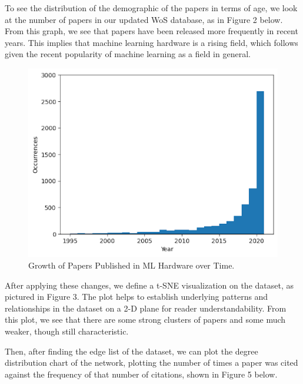 \documentclass[conference]{IEEEtran}
\begin{document}
To see the distribution of the demographic of the papers in terms of age, 
we look at the number of papers in our updated WoS database, as in Figure 2 
below. From this graph, we see that papers have been released more frequently 
in recent years. This implies that machine learning hardware is a rising field, 
which follows given the recent popularity of machine learning as a field in general. \par

\begin{figure}[htbp]
    \centerline{\includegraphics[scale=0.3] {papers_by_year.png}}
    \caption{Growth of Papers Published in ML Hardware over Time.}
    \label{fig}
\end{figure}

After applying these changes, we define a t-SNE visualization on the dataset, 
as pictured in Figure 3. The plot helps to establish underlying patterns and 
relationships in the dataset on a 2-D plane for reader understandability. 
From this plot, we see that there are some strong clusters of papers and 
some much weaker, though still characteristic. \par

Then, after finding the edge list of the dataset, we can plot the degree distribution 
chart of the network, plotting the number of times a paper was cited against the 
frequency of that number of citations, shown in Figure 5 below. \par
\end{document}

